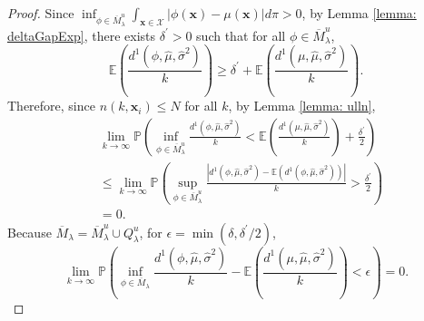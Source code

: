 \documentclass[12pt]{article}
\newcommand{\spa}[1]{\text{{$\mathcal{#1}$}}}
\newcommand{\vect}[1]{\ensuremath{\bm{#1}}}
\begin{document}
\begin{proof}
    Since $\inf_{\phi \in \overline{M}_\lambda^u} \int_{\vect{x} \in \spa{X}}|\phi(\vect{x})-\mu(\vect{x})|d\pi>0$, by Lemma \ref{lemma: deltaGapExp}, there exists $\delta^\prime>0$ such that for all $\phi \in \overline{M}_\lambda^u$, 
    $$\mathbb{E}\left ( \frac{d^1(\phi,\hat{\mu},\hat{\sigma}^2)}{k}\right )\geq \delta^\prime+\mathbb{E}\left ( \frac{d^1(\mu,\hat{\mu},\hat{\sigma}^2)}{k}\right ).$$
    Therefore, since $n(k,\vect{x}_i)\leq N$ for all $k$, by Lemma \ref{lemma: ulln},
    \begin{equation*}
        \begin{split}
             &\lim_{k \to \infty} \mathbb{P} \left (\inf_{\phi \in \overline{M}_\lambda^u}\frac{d^1(\phi,\hat{\mu},\hat{\sigma}^2)}{k}<\mathbb{E}\left (\frac{d^1(\mu,\hat{\mu},\hat{\sigma}^2)}{k}\right )+\frac{\delta^\prime}{2}\right )\\
             &\leq \lim_{k \to \infty}\mathbb{P}\left (\sup_{\phi \in \overline{M}^u_\lambda}\frac{|d^1(\phi,\hat{\mu},\hat{\sigma}^2)-\mathbb{E}\left ( d^1(\phi,\hat{\mu},\hat{\sigma}^2)\right )|}{k}>\frac{\delta^\prime}{2}\right )\\
             & =0.
        \end{split}
    \end{equation*}
    Because $\overline{M}_\lambda=\overline{M}_\lambda^u \cup Q_\lambda^u$, for $\epsilon=\min(\delta,\delta^\prime/2)$,
    $$\lim_{k \to \infty}\mathbb{P}\left (\inf_{\phi \in \overline{M}_\lambda} \frac{d^1(\phi,\hat{\mu},\hat{\sigma}^2)}{k}-\mathbb{E}\left (\frac{d^1(\mu,\hat{\mu},\hat{\sigma}^2)}{k}\right )<\epsilon\right )=0.$$
\end{proof}
\end{document}
